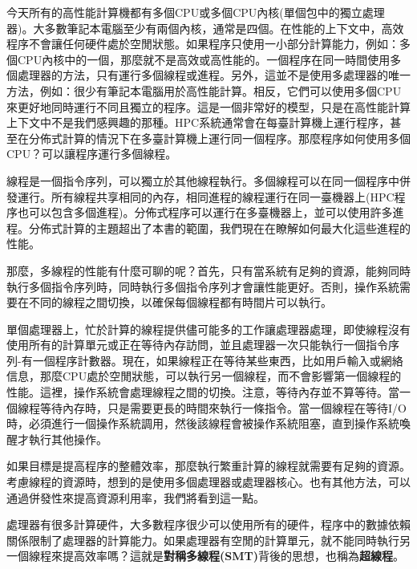
今天所有的高性能計算機都有多個CPU或多個CPU內核(單個包中的獨立處理器)。大多數筆記本電腦至少有兩個內核，通常是四個。在性能的上下文中，高效程序不會讓任何硬件處於空閒狀態。如果程序只使用一小部分計算能力，例如：多個CPU內核中的一個，那麼就不是高效或高性能的。一個程序在同一時間使用多個處理器的方法，只有運行多個線程或進程。另外，這並不是使用多處理器的唯一方法，例如：很少有筆記本電腦用於高性能計算。相反，它們可以使用多個CPU來更好地同時運行不同且獨立的程序。這是一個非常好的模型，只是在高性能計算上下文中不是我們感興趣的那種。HPC系統通常會在每臺計算機上運行程序，甚至在分佈式計算的情況下在多臺計算機上運行同一個程序。那麼程序如何使用多個CPU？可以讓程序運行多個線程。


線程是一個指令序列，可以獨立於其他線程執行。多個線程可以在同一個程序中併發運行。所有線程共享相同的內存，相同進程的線程運行在同一臺機器上(HPC程序也可以包含多個進程)。分佈式程序可以運行在多臺機器上，並可以使用許多進程。分佈式計算的主題超出了本書的範圍，我們現在在瞭解如何最大化這些進程的性能。

那麼，多線程的性能有什麼可聊的呢？首先，只有當系統有足夠的資源，能夠同時執行多個指令序列時，同時執行多個指令序列才會讓性能更好。否則，操作系統需要在不同的線程之間切換，以確保每個線程都有時間片可以執行。

單個處理器上，忙於計算的線程提供儘可能多的工作讓處理器處理，即使線程沒有使用所有的計算單元或正在等待內存訪問，並且處理器一次只能執行一個指令序列-有一個程序計數器。現在，如果線程正在等待某些東西，比如用戶輸入或網絡信息，那麼CPU處於空閒狀態，可以執行另一個線程，而不會影響第一個線程的性能。這裡，操作系統會處理線程之間的切換。注意，等待內存並不算等待。當一個線程等待內存時，只是需要更長的時間來執行一條指令。當一個線程在等待I/O時，必須進行一個操作系統調用，然後該線程會被操作系統阻塞，直到操作系統喚醒才執行其他操作。

如果目標是提高程序的整體效率，那麼執行繁重計算的線程就需要有足夠的資源。考慮線程的資源時，想到的是使用多個處理器或處理器核心。也有其他方法，可以通過併發性來提高資源利用率，我們將看到這一點。


處理器有很多計算硬件，大多數程序很少可以使用所有的硬件，程序中的數據依賴關係限制了處理器的計算能力。如果處理器有空閒的計算單元，就不能同時執行另一個線程來提高效率嗎？這就是\textbf{對稱多線程(SMT)}背後的思想，也稱為\textbf{超線程}。

